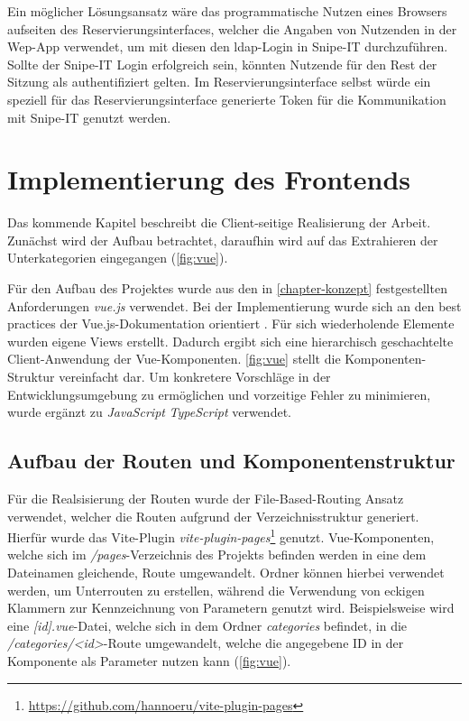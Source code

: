 Ein möglicher Lösungsansatz wäre das programmatische Nutzen eines Browsers aufseiten des
Reservierungsinterfaces, welcher die Angaben von Nutzenden in der Wep-App verwendet, um mit diesen
den \ac{ldap}-Login in Snipe-IT durchzuführen. Sollte der Snipe-IT Login erfolgreich sein, könnten
Nutzende für den Rest der Sitzung als authentifiziert gelten. Im Reservierungsinterface selbst
würde ein speziell für das Reservierungsinterface generierte Token für die Kommunikation mit
Snipe-IT genutzt werden.

\section{Implementierung des Frontends}
\label{subsec:frontend}
Das kommende Kapitel beschreibt die Client-seitige Realisierung der Arbeit. Zunächst wird der Aufbau
betrachtet, daraufhin wird auf das Extrahieren der Unterkategorien eingegangen (\ref{fig:vue}).


Für den Aufbau des Projektes wurde aus den in \ref{chapter-konzept} festgestellten Anforderungen
\textit{vue.js} verwendet. Bei der Implementierung wurde sich an den best practices der
Vue.js-Dokumentation orientiert \cite{You2022a}. Für sich wiederholende Elemente wurden
eigene Views erstellt. Dadurch ergibt sich eine hierarchisch geschachtelte Client-Anwendung der
Vue-Komponenten. \ref{fig:vue} stellt die Komponenten-Struktur vereinfacht dar. Um
konkretere Vorschläge in der Entwicklungsumgebung zu ermöglichen und vorzeitige Fehler zu
minimieren, wurde ergänzt zu \textit{JavaScript} \textit{TypeScript} verwendet.

\subsection{Aufbau der Routen und Komponentenstruktur}
Für die Realsisierung der Routen wurde der File-Based-Routing Ansatz verwendet, welcher die Routen
aufgrund der Verzeichnisstruktur generiert. Hierfür wurde das Vite-Plugin
\textit{vite-plugin-pages}\footnote{\url{https://github.com/hannoeru/vite-plugin-pages}} genutzt.
Vue-Komponenten, welche sich im \textit{/pages}-Verzeichnis des Projekts befinden werden in eine
dem Dateinamen gleichende, Route umgewandelt. Ordner können hierbei verwendet werden, um Unterrouten
zu erstellen, während die Verwendung von eckigen Klammern zur Kennzeichnung von Parametern genutzt
wird. Beispielsweise wird eine \textit{[id].vue}-Datei, welche sich in dem Ordner
\textit{categories} befindet, in die \textit{/categories/<id>}-Route umgewandelt, welche die
angegebene ID in der Komponente als Parameter nutzen kann (\ref{fig:vue}).

